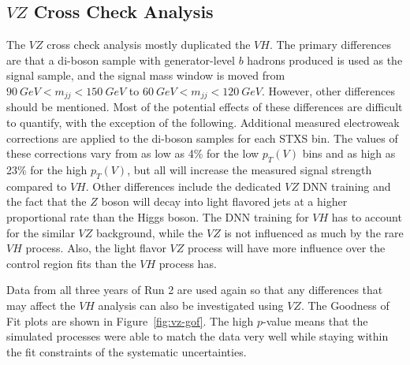 \subsection{$V\!Z$ Cross Check Analysis}

The $V\!Z$ cross check analysis mostly duplicated the $V\!H$. 
The primary differences are that a di-boson sample with generator-level $b$ hadrons produced
is used as the signal sample, and the signal mass window is moved from $\SI{90}{GeV} < m_{jj} < \SI{150}{GeV}$
to  $\SI{60}{GeV} < m_{jj} < \SI{120}{GeV}$.
However, other differences should be mentioned.
Most of the potential effects of these differences are difficult to quantify,
with the exception of the following.
Additional measured electroweak corrections are applied to the di-boson samples for each STXS bin.
The values of these corrections vary from as low as 4\% for the low $p_T(V)$ bins
and as high as 23\% for the high $p_T(V)$, but all will increase the measured signal strength compared to $V\!H$.
Other differences include the dedicated $V\!Z$ DNN training and
the fact that the $Z$ boson will decay into light flavored jets at a higher proportional rate than the Higgs boson.
The DNN training for $V\!H$ has to account for the similar $V\!Z$ background,
while the $V\!Z$ is not influenced as much by the rare $V\!H$ process.
Also, the light flavor $V\!Z$ process will have more influence over
the control region fits than the $V\!H$ process has.

Data from all three years of Run 2 are used again so that any differences that may affect the $V\!H$ analysis
can also be investigated using $V\!Z$.
The Goodness of Fit plots are shown in
Figure~\ref{fig:vz-gof}. 
The high $p$-value means that the simulated processes were able to match the data very well
while staying within the fit constraints of the systematic
uncertainties.  

